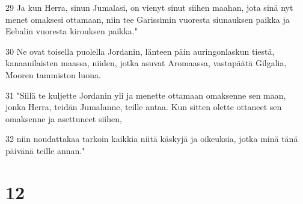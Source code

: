 \par 29 Ja kun Herra, sinun Jumalasi, on vienyt sinut siihen maahan, jota sinä nyt menet omaksesi ottamaan, niin tee Garissimin vuoresta siunauksen paikka ja Eebalin vuoresta kirouksen paikka."
\par 30 Ne ovat toisella puolella Jordanin, länteen päin auringonlaskun tiestä, kanaanilaisten maassa, niiden, jotka asuvat Aromaassa, vastapäätä Gilgalia, Mooren tammiston luona.
\par 31 "Sillä te kuljette Jordanin yli ja menette ottamaan omaksenne sen maan, jonka Herra, teidän Jumalanne, teille antaa. Kun sitten olette ottaneet sen omaksenne ja asettuneet siihen,
\par 32 niin noudattakaa tarkoin kaikkia niitä käskyjä ja oikeuksia, jotka minä tänä päivänä teille annan."

\chapter{12}

